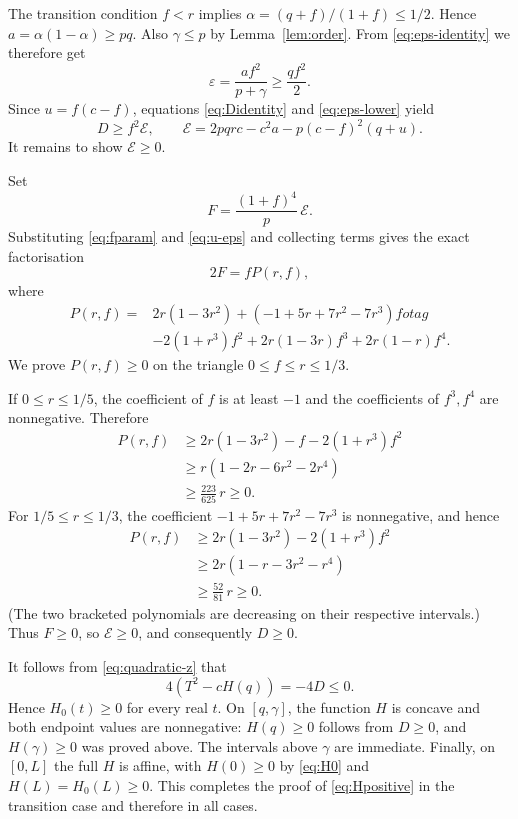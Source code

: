 \documentclass[11pt]{article}
\theoremstyle{remark}
\begin{document}
The transition condition $f<r$ implies
$\alpha=(q+f)/(1+f)\le1/2$.  Hence $a=\alpha(1-\alpha)\ge pq$.
Also $\gamma\le p$ by Lemma~\ref{lem:order}.  From
\eqref{eq:eps-identity} we therefore get
\begin{equation}\label{eq:eps-lower}
 \varepsilon=\frac{af^2}{p+\gamma}
 \ge\frac{qf^2}{2}.
\end{equation}
Since $u=f(c-f)$, equations \eqref{eq:Didentity} and
\eqref{eq:eps-lower} yield
\begin{equation}\label{eq:Dlower}
 D\ge f^2\mathcal E,
 \qquad
 \mathcal E=2pqrc-c^2a-p(c-f)^2(q+u).
\end{equation}
It remains to show $\mathcal E\ge0$.

Set
\begin{equation}\label{eq:Fdef}
 F=\frac{(1+f)^4}{p}\,\mathcal E.
\end{equation}
Substituting \eqref{eq:fparam} and \eqref{eq:u-eps} and collecting terms gives
the exact factorisation
\begin{equation}\label{eq:Pfactor}
 2F=fP(r,f),
\end{equation}
where
\begin{align}
 P(r,f)={}&2r(1-3r^2)
 +(-1+5r+7r^2-7r^3)f 
otag\\
 &-2(1+r^3)f^2
 +2r(1-3r)f^3+2r(1-r)f^4.                    \label{eq:Ppoly}
\end{align}
We prove $P(r,f)\ge0$ on the triangle $0\le f\le r\le1/3$.

If $0\le r\le1/5$, the coefficient of $f$ is at least $-1$ and the
coefficients of $f^3,f^4$ are nonnegative.  Therefore
\begin{align*}
 P(r,f)
 &\ge2r(1-3r^2)-f-2(1+r^3)f^2\\
 &\ge r(1-2r-6r^2-2r^4)\\
 &\ge \frac{223}{625}\,r\ge0.
\end{align*}
For $1/5\le r\le1/3$, the coefficient
$-1+5r+7r^2-7r^3$ is nonnegative, and hence
\begin{align*}
 P(r,f)
 &\ge2r(1-3r^2)-2(1+r^3)f^2\\
 &\ge2r(1-r-3r^2-r^4)\\
 &\ge\frac{52}{81}\,r\ge0.
\end{align*}
(The two bracketed polynomials are decreasing on their respective intervals.)
Thus $F\ge0$, so $\mathcal E\ge0$, and consequently $D\ge0$.

It follows from \eqref{eq:quadratic-z} that
\[
 4(T^2-cH(q))=-4D\le0.
\]
Hence $H_0(t)\ge0$ for every real $t$.  On $[q,\gamma]$, the function $H$ is
concave and both endpoint values are nonnegative: $H(q)\ge0$ follows from
$D\ge0$, and $H(\gamma)\ge0$ was proved above.  The intervals above $\gamma$
are immediate.  Finally, on $[0,L]$ the full $H$ is affine, with
$H(0)\ge0$ by \eqref{eq:H0} and $H(L)=H_0(L)\ge0$.
This completes the proof of \eqref{eq:Hpositive} in the transition case and
therefore in all cases.
\end{document}
